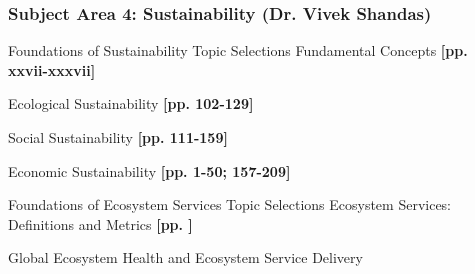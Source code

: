 \documentclass[12pt]{article}
\begin{document}
\newpage
\subsubsection{Subject Area 4: Sustainability (Dr. Vivek Shandas)}
\begin{outline}[enumerate]
\1 Foundations of Sustainability
\2 Topic Selections
\3 Fundamental Concepts
\4 \cite{harris_survey_2001} \textbf{[pp. xxvii-xxxvii]}
\4 \cite{marshall_framing_2005}

\3 Ecological Sustainability
\4 \cite{pearce_blueprint_2000} \textbf{[pp. 102-129]}
\4 \cite{folke_regime_2004}
\4 \cite{schnaiberg_treadmill_2002}

\3 Social Sustainability
\4 \cite{sen_development_2000}\textbf{[pp. 111-159]}
\4 \cite{pastor_environmental_2007}
\4 \cite{miringoff_growing_1996}
\4 \cite{oecd_well-being_2001}
\4 \cite{berbes-blazquez_towards_2016}

\3 Economic Sustainability
\4 \cite{pearce_blueprint_2000} \textbf{[pp. 1-50; 157-209]}
\4 \cite{costanza_natural_1992}
\4 \cite{daly_economics_1974}
\4 \cite{goodwin_five_2003}


\1 Foundations of Ecosystem Services
\2 Topic Selections
\3 Ecosystem Services: Definitions and Metrics
\4 \cite{millennium_ecosystem_assessment_program_ecosystems_2005} \textbf{[pp. ]}
\4 \cite{wallace_classification_2007}
\4 \cite{nelson_modeling_2009}
\4 \cite{costanza_value_1997}
\4 \cite{kremen_managing_2005}
\4 \cite{muradian_reconciling_2010}
\4 \cite{niemela_using_2010}
\4 \cite{norgaard_ecosystem_2010}

\3 Global Ecosystem Health and Ecosystem Service Delivery
\4 \cite{zhao_drought-induced_2010}
\4 \cite{hoegh-guldberg_impact_2010}
\4 \cite{lobell_climate_2011}
\4 \cite{dodds_human_2013}
\4 \cite{rogers_facing_2008}
\4 \cite{eigenbrod_impact_2011}
\end{outline}

\clearpage 
\renewcommand{\thepage}{}
\printbibliography
\end{document}
